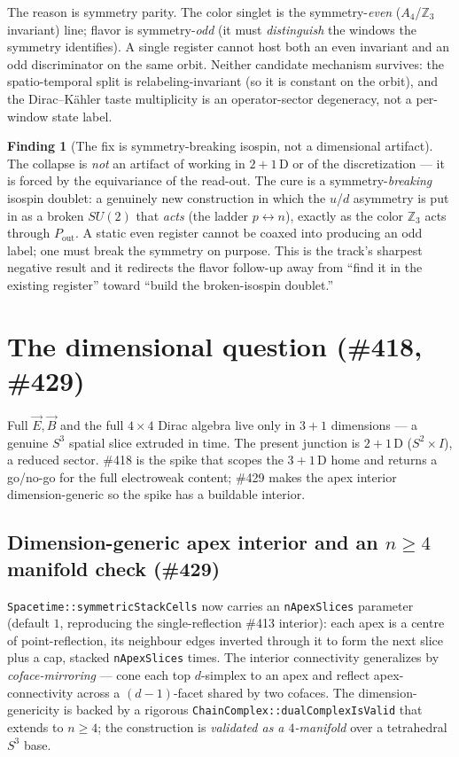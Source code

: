 \documentclass[11pt]{article}
\theoremstyle{definition}
\newtheorem{finding}{Finding}
\newcommand{\Z}{\mathbb{Z}}
\newcommand{\Pout}{P_{\mathrm{out}}}
\newcommand{\code}[1]{\texttt{#1}}
\begin{document}
The reason is symmetry parity. The color singlet is the symmetry-\emph{even} ($A_4$/$\Z_3$
invariant) line; flavor is symmetry-\emph{odd} (it must \emph{distinguish} the windows the
symmetry identifies). A single register cannot host both an even invariant and an odd
discriminator on the same orbit. Neither candidate mechanism survives: the spatio-temporal
split is relabeling-invariant (so it is constant on the orbit), and the Dirac--K\"ahler
taste multiplicity is an operator-sector degeneracy, not a per-window state label.

\begin{finding}[The fix is symmetry-breaking isospin, not a dimensional artifact]
\label{find:flavor}
The collapse is \emph{not} an artifact of working in $2+1$\,D or of the discretization ---
it is forced by the equivariance of the read-out. The cure is a symmetry-\emph{breaking}
isospin doublet: a genuinely new construction in which the $u$/$d$ asymmetry is put in as a
broken $SU(2)$ that \emph{acts} (the ladder $p\leftrightarrow n$), exactly as the color
$\Z_3$ acts through $\Pout$. A static even register cannot be coaxed into producing an odd
label; one must break the symmetry on purpose. This is the track's sharpest negative
result and it redirects the flavor follow-up away from ``find it in the existing register''
toward ``build the broken-isospin doublet.''
\end{finding}

\section{The dimensional question (\#418, \#429)}
\label{sec:dim}

Full $\vec E,\vec B$ and the full $4\times4$ Dirac algebra live only in $3+1$ dimensions ---
a genuine $S^3$ spatial slice extruded in time. The present junction is $2+1$\,D
($S^2\times I$), a reduced sector. \#418 is the spike that scopes the $3+1$\,D home and
returns a go/no-go for the full electroweak content; \#429 makes the apex interior
dimension-generic so the spike has a buildable interior.

\subsection{Dimension-generic apex interior and an $n\ge4$ manifold check (\#429)}

\code{Spacetime::symmetricStackCells} now carries an \code{nApexSlices} parameter
(default $1$, reproducing the single-reflection \#413 interior): each apex is a centre of
point-reflection, its neighbour edges inverted through it to form the next slice plus a
cap, stacked \code{nApexSlices} times. The interior connectivity generalizes by
\emph{coface-mirroring} --- cone each top $d$-simplex to an apex and reflect
apex-connectivity across a $(d-1)$-facet shared by two cofaces. The dimension-genericity
is backed by a rigorous \code{ChainComplex::dualComplexIsValid} that extends to $n\ge4$;
the construction is \emph{validated as a $4$-manifold} over a tetrahedral $S^3$ base.
\end{document}
